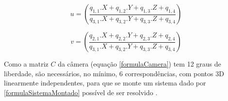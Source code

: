 	\begin{equation}
		\label{formulaSistemaSimples1}
		u = \left(\frac{q_{1,1} . X + q_{1,2} . Y + q_{1,3} . Z + q_{1,4}}{q_{3,1} . X + q_{3,2} . Y + q_{3,3} . Z + q_{3,4}} \right)
	\end{equation}
	
	\begin{equation}
		\label{formulaSistemaSimples2}
		v = \left(\frac{q_{2,1} . X + q_{2,2} . Y + q_{2,3} . Z + q_{2,4}}{q_{3,1} . X + q_{3,2} . Y + q_{3,3} . Z + q_{3,4}} \right) 
	\end{equation}
	
	Como a matriz $C$ da câmera (equação \ref{formulaCamera}) tem 12 graus de liberdade, são necessários, no mínimo, 6 correspondências, com pontos 3D linearmente independentes, para que se monte um sistema dado por \ref{formulaSistemaMontado} possível de ser resolvido \cite{lectureCameraCalibration}.
	
